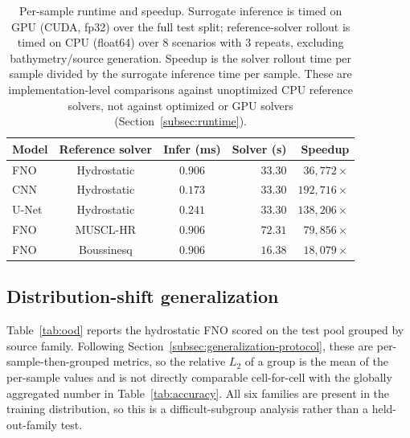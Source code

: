 \begin{table}[!htbp]
\centering
\caption{Per-sample runtime and speedup. Surrogate inference is timed on GPU (CUDA, fp32) over the full test split; reference-solver rollout is timed on CPU (float64) over $8$ scenarios with $3$ repeats, excluding bathymetry/source generation. Speedup is the solver rollout time per sample divided by the surrogate inference time per sample. These are implementation-level comparisons against unoptimized CPU reference solvers, not against optimized or GPU solvers (Section~\ref{subsec:runtime}).}
\label{tab:speed}
\begin{tabular}{lccrr}
    \toprule
    Model & Reference solver & Infer (ms) & Solver (s) & Speedup \\
    \midrule
    FNO   & Hydrostatic & $0.906$ & $33.30$ & $36{,}772 \times$ \\
    CNN   & Hydrostatic & $0.173$ & $33.30$ & $192{,}716 \times$ \\
    U-Net & Hydrostatic & $0.241$ & $33.30$ & $138{,}206 \times$ \\
    FNO   & MUSCL-HR    & $0.906$ & $72.31$ & $79{,}856 \times$ \\
    FNO   & Boussinesq  & $0.906$ & $16.38$ & $18{,}079 \times$ \\
    \bottomrule
\end{tabular}
\end{table}

\subsection{Distribution-shift generalization}
\label{subsec:res-ood}

Table~\ref{tab:ood} reports the hydrostatic FNO scored on the test pool grouped by source family. Following Section~\ref{subsec:generalization-protocol}, these are per-sample-then-grouped metrics, so the relative $L_2$ of a group is the mean of the per-sample values and is not directly comparable cell-for-cell with the globally aggregated number in Table~\ref{tab:accuracy}. All six families are present in the training distribution, so this is a difficult-subgroup analysis rather than a held-out-family test.

